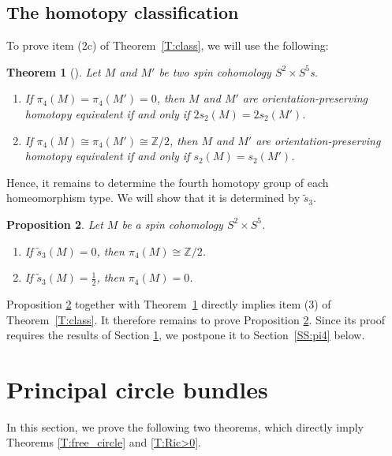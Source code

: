 \documentclass[10pt,a4paper]{amsart}
\numberwithin{equation}{section}
\newtheorem{Theorem}{Theorem}[section]
\newtheorem{Proposition}[Theorem]{Proposition}
\theoremstyle{definition}
\numberwithin{table}{section}
\newcommand{\Z}{\mathbb{Z}}
\begin{document}
\subsection{The homotopy classification}

To prove item (2c) of Theorem~\ref{T:class}, we will use the following:
\begin{Theorem}[{\cite[Theorem 0.1]{Kr98}}]\label{T:hom_class}
	Let $M$ and $M'$ be two spin cohomology $S^2\times S^5$s.
	\begin{enumerate}\itemsep=0pt
		\item[$(1)$] If $\pi_4(M)=\pi_4(M')=0$, then $M$ and $M'$ are orientation-preserving homotopy equivalent if and only if $2s_2(M)=2s_2(M')$.
		\item[$(2)$] If $\pi_4(M)\cong\pi_4(M')\cong\Z/2$, then $M$ and $M'$ are orientation-preserving homotopy equivalent if and only if $s_2(M)=s_2(M')$.
	\end{enumerate}
\end{Theorem}
Hence, it remains to determine the fourth homotopy group of each homeomorphism type. We will show that it is determined by $\tilde{s}_3$.
\begin{Proposition}\label{P:pi4}
	Let $M$ be a spin cohomology $S^2\times S^5$.
	\begin{enumerate}\itemsep=0pt
		\item[$(1)$] If $\tilde{s}_3(M)=0$, then $\pi_4(M)\cong\Z/2$.
		\item[$(2)$] If $\tilde{s}_3(M)=\frac{1}{2}$, then $\pi_4(M)=0$.
	\end{enumerate}
\end{Proposition}
Proposition \ref{P:pi4} together with Theorem~\ref{T:hom_class} directly implies item (3) of Theorem~\ref{T:class}. It therefore remains to prove Proposition \ref{P:pi4}. Since its proof requires the results of Section \ref{S:circ_bund}, we postpone it to Section~\ref{SS:pi4} below.

\section{Principal circle bundles}\label{S:circ_bund}

In this section, we prove the following two theorems, which directly imply Theorems \ref{T:free_circle} and \ref{T:Ric>0}.
\end{document}
